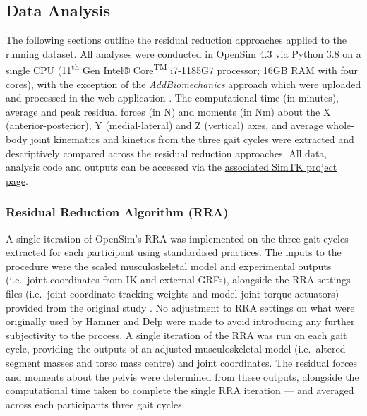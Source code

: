\documentclass[]{elsarticle} %
\begin{document}
\hypertarget{data-analysis}{%
\subsection{Data Analysis}\label{data-analysis}}

The following sections outline the residual reduction approaches applied
to the running dataset. All analyses were conducted in OpenSim 4.3 via
Python 3.8 on a single CPU (11\textsuperscript{th} Gen Intel®
Core\textsuperscript{TM} i7-1185G7 processor; 16GB RAM with four cores),
with the exception of the \emph{AddBiomechanics} approach which were
uploaded and processed in the web application
\citep{AddBiomechanics2023}. The computational time (in minutes),
average and peak residual forces (in N) and moments (in Nm) about the X
(anterior-posterior), Y (medial-lateral) and Z (vertical) axes, and
average whole-body joint kinematics and kinetics from the three gait
cycles were extracted and descriptively compared across the residual
reduction approaches. All data, analysis code and outputs can be
accessed via the
\href{https://simtk.org/projects/dynamic-quest}{associated SimTK project
page}.

\hypertarget{residual-reduction-algorithm-rra}{%
\subsubsection{Residual Reduction Algorithm
(RRA)}\label{residual-reduction-algorithm-rra}}

A single iteration of OpenSim's RRA was implemented on the three gait
cycles extracted for each participant using standardised practices. The
inputs to the procedure were the scaled musculoskeletal model and
experimental outputs (i.e.~joint coordinates from IK and external GRFs),
alongside the RRA settings files (i.e.~joint coordinate tracking weights
and model joint torque actuators) provided from the original study
\citep{Hamner2013}. No adjustment to RRA settings on what were
originally used by Hamner and Delp \citep{Hamner2013} were made to avoid
introducing any further subjectivity to the process. A single iteration
of the RRA was run on each gait cycle, providing the outputs of an
adjusted musculoskeletal model (i.e.~altered segment masses and torso
mass centre) and joint coordinates. The residual forces and moments
about the pelvis were determined from these outputs, alongside the
computational time taken to complete the single RRA iteration --- and
averaged across each participants three gait cycles.
\end{document}
